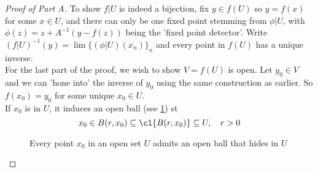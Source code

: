 \documentclass[../main-v2-manifolds.tex]{subfiles}
\begin{document}
\begin{proof}[Proof of Part A]
    To show $f|U$ is indeed a bijection, fix $y\in f(U)$ so $y = f(x)$ for some $x\in U$, and there can only be one fixed point stemming from $\phi|U$, with $\phi(z) = z + A^{-1}(y-f(z))$ being the 'fixed point detector'. Write $(f|U)^{-1}(y) = \lim \{(\phi|U)(x_n)\}_n$ and every point in $f(U)$ has a unique inverse.\\

    For the last part of the proof, we wish to show $V = f(U)$ is open. Let $y_0\in V$ and we can 'hone into' the inverse of $y_0$ using the same construction as earlier. So $f(x_0) = y_0$ for some unique $x_0\in U$.\\
    
    If $x_0$ is in $U$, it induces an open ball (see \cref{rudin-chp9-open set induces ball that hides inside}) st
    \[
        x_0\in B(r,x_0)\subseteq \cl{B(r,x_0)}\subseteq U,\quad r>0
    \]

    \begin{figure}
        \centering
        \caption{Every point $x_0$ in an open set $U$ admits an open ball that hides in $U$}
        \label{rudin-chp9-open set induces ball that hides inside}
    \end{figure}


\end{proof}
\end{document}

